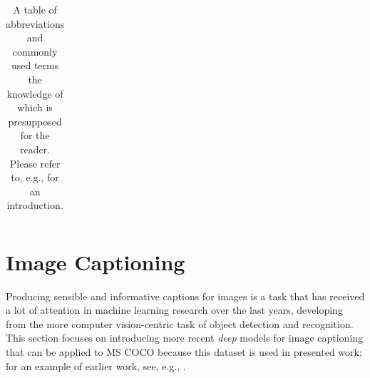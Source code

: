 \begin{table}[]
\begin{tabularx}{\textwidth}{|X|X|}
	\end{tabularx}
\caption{\label{tab:defs}A table of abbreviations and commonly used terms the knowledge of which is presupposed for the reader. Please refer to, e.g., \cite{goodfellow2016deep} for an introduction.}

\end{table}


\section{Image Captioning}
\label{image_captioning}
Producing sensible and informative captions for images is a task that has received a lot of attention in machine learning research over the last years, developing from the more computer vision-centric task of object detection and recognition. %
This section focuses on introducing more recent \textit{deep} models \parencite{lecun2015deep} for image captioning that can be applied to MS COCO because this dataset is used in presented work; for an example of earlier work, see, e.g., \cite{kulkarni2013babytalk}.


